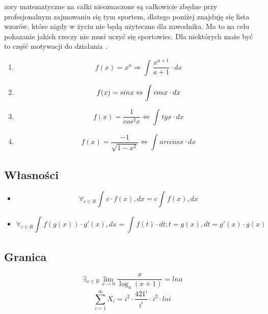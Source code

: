 \documentclass[12pt]{article}
\begin{document}
zory matematyczne na całki nieoznaczone są całkowicie zbędne przy profesjonalnym zajmowaniu się tym sportem, dlatego poniżej znajduję się lista wzorów, które nigdy w życiu nie będą użyteczne dla zawodnika. Ma to na celu pokazanie jakich rzeczy nie musi uczyć się sportowiec. Dla niektórych może być to część motywacji do działania
\cite{greenwade93}.

\begin{enumerate}
\item  $$f(x)=x^a \Rightarrow\int_{}^{} \frac{x^{a+1}}{a+1} \cdot dx$$

\item $$f(x)=sinx \Leftrightarrow \int_{}^{} \-cosx \cdot dx$$

\item $$f(x)=\frac{1}{cos^2x} \Leftrightarrow \int_{}^{} tgx \cdot dx$$

\item $$f(x)=\frac{-1}{\sqrt{1-x^2}} \Leftrightarrow \int_{}^{} arccosx \cdot dx$$
\end{enumerate}
\subsection{Własności}

\begin{itemize}

\item  $$\forall_{c \in R} \int_{}^{} c \cdot f(x),dx = c \int_{}^{} f(x), dx  $$

\item $$\forall_{c \in R} \int_{}^{} f(g(x)) \cdot g'(x), dx =  \int_{}^{} f(t) \cdot dt ; t=g(x), dt = g'(x) \cdot g(x)  $$

\end{itemize}

\subsection{Granica }

$$\exists_{x \in R} \lim_{x \to 0}\frac{x}{\log_a (x+1)}=lna$$
$$\sum_{i=1}^\infty X_i=i^2\cdot \frac{421^i}{i^i} \cdot i^2 \cdot lni$$


\listoffigures

\listoftables



\end{document}
